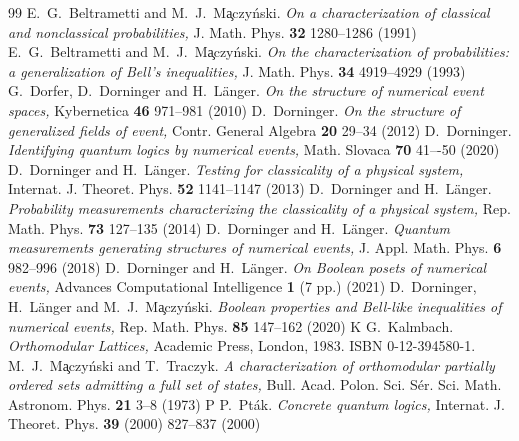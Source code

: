 \documentclass[a4paper]{article} %
\begin{document}
\begin{thebibliography}{99}	
E.~G.~Beltrametti and M.~J.~M\c aczy\'nski.
\newblock\emph{On a characterization of classical and nonclassical probabilities,}
\newblock J. Math. Phys. \textbf{32} 1280--1286 (1991)
E.~G.~Beltrametti and M.~J.~M\c aczy\'nski.
\newblock\emph{On the characterization of probabilities: a generalization of Bell's inequalities,}
\newblock J. Math. Phys. \textbf{34} 4919--4929 (1993)
G.~Dorfer, D.~Dorninger and H.~L\"anger.
\newblock\emph{On the structure of numerical event spaces,}
\newblock Kybernetica \textbf{46} 971--981 (2010)
D.~Dorninger.
\newblock\emph{On the structure of generalized fields of event,}
\newblock Contr. General Algebra \textbf{20} 29--34 (2012)
D.~Dorninger.
\newblock\emph{Identifying quantum logics by numerical events,}
\newblock Math. Slovaca \textbf{70} 41–-50 (2020)
D.~Dorninger and H.~L\"anger.
\newblock\emph{Testing for classicality of a physical system,}
\newblock Internat. J. Theoret. Phys. \textbf{52} 1141--1147 (2013)
D.~Dorninger and H.~L\"anger.
\newblock\emph{Probability measurements characterizing the classicality of a physical system,}
\newblock Rep. Math. Phys. \textbf{73} 127--135 (2014)
D.~Dorninger and H.~L\"anger.
\newblock\emph{Quantum measurements generating structures of numerical events,}
\newblock J. Appl. Math. Phys. \textbf{6} 982--996 (2018)
D.~Dorninger and H.~L\"anger.
\newblock\emph{On Boolean posets of numerical events,}
\newblock Advances Computational Intelligence \textbf{1} (7 pp.) (2021)
D.~Dorninger, H.~L\"anger and M.~J.~M\c aczy\'nski.
\newblock\emph{Boolean properties and Bell-like inequalities of numerical events,}
\newblock Rep. Math. Phys. \textbf{85} 147--162 (2020)
\bibitem K
G.~Kalmbach.
\newblock\emph{Orthomodular Lattices,}
\newblock Academic Press, London, 1983. ISBN 0-12-394580-1.
M.~J.~M\c aczy\'nski and T.~Traczyk.
\newblock\emph{A characterization of orthomodular partially ordered sets admitting a full set of states,}
\newblock Bull. Acad. Polon. Sci. S\'er. Sci. Math. Astronom. Phys. \textbf{21} 3--8 (1973)
\bibitem P
P.~Pt\'ak.
\newblock\emph{Concrete quantum logics,}
\newblock Internat. J. Theoret. Phys. \textbf{39} (2000) 827--837 (2000)
	\end{thebibliography}
	
\end{document}
